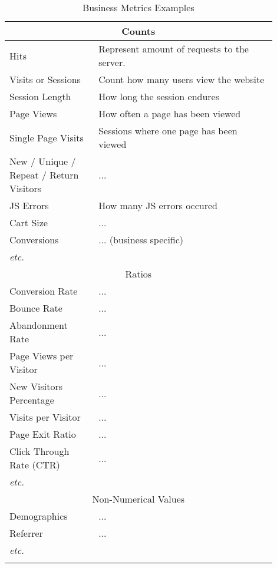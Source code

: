 \begin{center}
	\small
	\begin{longtable}{ | p{0.3\linewidth} | p{0.6\linewidth} | }
	
	\hline
	\multicolumn{2}{|c|}{ \cellcolor{lightgrey} Counts} \\
	\hline
	Hits & Represent amount of requests to the server.  \\ %
	\hline
	Visits or Sessions & Count how many users view the website \\ %
	\hline
	Session Length & How long the session endures \\ %
	\hline
	Page Views & How often a page has been viewed \\ %
	\hline
	Single Page Visits & Sessions where one page has been viewed \\ %
	\hline
	New / Unique / Repeat / Return Visitors & ... \\
	\hline
	JS Errors & How many JS errors occured \\
	\hline
	Cart Size & ... \\
	\hline
	Conversions & ...  (business specific) \\
	\hline
	\textit{etc.} &  \\

	\hline
	\multicolumn{2}{|c|}{ \cellcolor{lightgrey} Ratios} \\
	\hline
	Conversion Rate & ... \\
	\hline
	Bounce Rate & ... \\
	\hline
	Abandonment Rate & ... \\
	\hline
	Page Views per Visitor & ... \\
	\hline
	New Visitors Percentage & ... \\
	\hline
	Visits per Visitor & ... \\
	\hline
	Page Exit Ratio & ... \\
	\hline
	Click Through Rate (CTR) & ... \\
	\hline
	\textit{etc.} & \\	
	
	\hline
	\multicolumn{2}{|c|}{ \cellcolor{lightgrey} Non-Numerical Values} \\
	\hline
	Demographics & ... \\	
	\hline
	Referrer & ... \\	
	\hline
	\textit{etc.} &  \\
	\hline
	
	\caption{Business Metrics Examples} %
	\label{tab:businessmetrics}
	\end{longtable}
\end{center}



